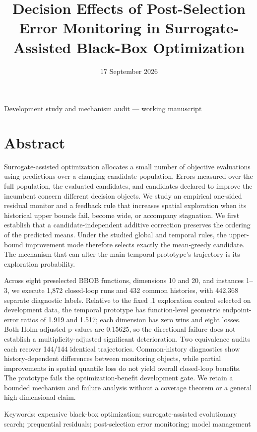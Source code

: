 \documentclass[11pt,a4paper]{article}
\title{Decision Effects of Post-Selection Error Monitoring in
Surrogate-Assisted Black-Box Optimization}
\author{}
\date{17 September 2026}
\begin{document}
\maketitle
\begin{center}Development study and mechanism audit --- working
manuscript\end{center}
\hypertarget{abstract}{%
\section{Abstract}\label{abstract}}

Surrogate-assisted optimization allocates a small number of objective
evaluations using predictions over a changing candidate population.
Errors measured over the full population, the evaluated candidates, and
candidates declared to improve the incumbent concern different decision
objects. We study an empirical one-sided residual monitor and a feedback
rule that increases spatial exploration when its historical upper bounds
fail, become wide, or accompany stagnation. We first establish that a
candidate-independent additive correction preserves the ordering of the
predicted means. Under the studied global and temporal rules, the
upper-bound improvement mode therefore selects exactly the mean-greedy
candidate. The mechanism that can alter the main temporal prototype's
trajectory is its exploration probability.

Across eight preselected BBOB functions, dimensions 10 and 20, and
instances 1--3, we execute 1,872 closed-loop runs and 432 common
histories, with 442,368 separate diagnostic labels. Relative to the
fixed .1 exploration control selected on development data, the temporal
prototype has function-level geometric endpoint-error ratios of 1.919
and 1.517; each dimension has zero wins and eight losses. Both
Holm-adjusted p-values are 0.15625, so the directional failure does not
establish a multiplicity-adjusted significant deterioration. Two
equivalence audits each recover 144/144 identical trajectories.
Common-history diagnostics show history-dependent differences between
monitoring objects, while partial improvements in spatial quantile loss
do not yield overall closed-loop benefits. The prototype fails the
optimization-benefit development gate. We retain a bounded mechanism and
failure analysis without a coverage theorem or a general
high-dimensional claim.

Keywords: expensive black-box optimization; surrogate-assisted
evolutionary search; prequential residuals; post-selection error
monitoring; model management
\end{document}
